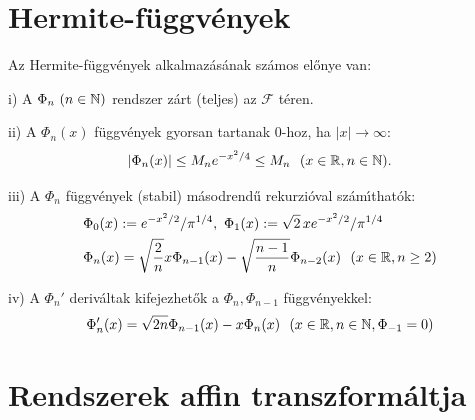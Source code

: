 \documentclass[oneside,titlepage,12pt,a4paper]{report}
\begin{document}
\section{Hermite-f\"uggv\'enyek}

Az Hermite-f\"uggv\'enyek alkalmaz\'as\'anak sz\'amos el\H onye van:

\bigskip
i) A $\Phi_n\ (n\in\Bbb N)$ rendszer z\'art (teljes) az $\mathcal F$ t\'eren.

\bigskip
ii) A $\Phi_n(x)$ f\"uggv\'enyek gyorsan tartanak $0$-hoz, ha $|x|\to \infty$:
$$
|\Phi_n(x)|\le M_n e^{-x^2/4}\le M_n\ \ (x\in\Bbb R, n\in\Bbb N).
$$

\bigskip
iii) A $\Phi_n$ f\"uggv\'enyek (stabil) m\'asodrend\H u rekurzi\'oval sz\'am\'\i that\'ok:
\begin{equation}
\begin{split}
&\Phi_0(x):=e^{-x^2/2}/\pi^{1/4},\ \Phi_1(x):=\sqrt{2}\, x e^{-x^2/2}/\pi^{1/4}\\
&\Phi_n(x)=\sqrt{\frac 2 n} x \Phi_{n-1}(x)-\sqrt{\frac{n-1}n}\Phi_{n-2}(x)\ \ (x\in\Bbb R, n\ge 2)
\end{split}
\end{equation}

\bigskip
iv) A $\Phi_n'$ deriv\'altak kifejezhet\H ok a $\Phi_n, \Phi_{n-1} $ f\"uggv\'enyekkel:
\begin{equation}
\Phi_n'(x)=\sqrt{2n}\Phi_{n-1}(x)-x\Phi_n(x)\ \ (x\in\Bbb R, n\in\Bbb N,\Phi_{-1}=0)
\end{equation}

\section{Rendszerek affin transzform\'altja }
\end{document}

